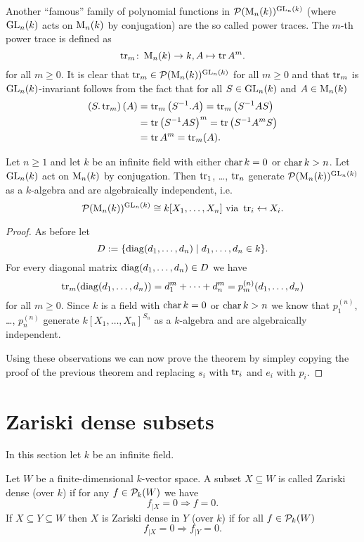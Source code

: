 Another ``famous'' family of polynomial functions in $\mathcal{P}(\operatorname{M}_n(k))^{\operatorname{GL}_n(k)}$ (where $\operatorname{GL}_n(k)$ acts on $\operatorname{M}_n(k)$ by conjugation) are the so called power traces. The $m$-th power trace is defined as
\[
 \operatorname{tr}_m \colon \operatorname{M}_n(k) \to k, A \mapsto \operatorname{tr} A^m.
\]
for all $m \geq 0$. It is clear that $\operatorname{tr}_m \in \mathcal{P}(\operatorname{M}_n(k))^{\operatorname{GL}_n(k)}$ for all $m \geq 0$ and that $\operatorname{tr}_m$ is $\operatorname{GL}_n(k)$-invariant follows from the fact that for all $S \in \operatorname{GL}_n(k)$ and $A \in \operatorname{M}_n(k)$
\begin{align*}
 \left(S.\operatorname{tr}_m\right)(A)
 &= \operatorname{tr}_m\left(S^{-1}.A\right)
 = \operatorname{tr}_m\left(S^{-1} A S\right) \\
 &= \operatorname{tr} \left(S^{-1} A S\right)^m
 = \operatorname{tr} \left(S^{-1} A^m S\right) \\
 &= \operatorname{tr} A^m
 = \operatorname{tr}_m(A).
\end{align*}


\begin{thrm}
 Let $n \geq 1$ and let $k$ be an infinite field with either $\operatorname{char} k = 0$ or $\operatorname{char} k > n$. Let $\operatorname{GL}_n(k)$ act on $\operatorname{M}_n(k)$ by conjugation. Then $\operatorname{tr}_1$, \dots, $\operatorname{tr}_n$ generate $\mathcal{P}(\operatorname{M}_n(k))^{\operatorname{GL}_n(k)}$ as a $k$-algebra and are algebraically independent, i.e.
 \[
  \mathcal{P}(\operatorname{M}_n(k))^{\operatorname{GL}_n(k)} \cong k[X_1, \dotsc, X_n] \text{ via } \operatorname{tr}_i \mapsfrom X_i.
 \]
\end{thrm}
\begin{proof}
 As before let 
 \[
  D := \{\operatorname{diag}(d_1, \dotsc, d_n) \mid d_1, \dotsc, d_n \in k\}.
 \]
 For every diagonal matrix $\operatorname{diag}(d_1, \dotsc, d_n) \in D$ we have
 \[
  \operatorname{tr}_m(\operatorname{diag}(d_1, \dotsc, d_n)) = d_1^m + \dotsb + d_n^m = p^{(n)}_m(d_1, \dotsc, d_n)
 \]
 for all $m \geq 0$. Since $k$ is a field with $\operatorname{char} k = 0$ or $\operatorname{char} k > n$ we know that $p^{(n)}_1$, \dots, $p^{(n)}_n$ generate $k[X_1, \dotsc, X_n]^{S_n}$ as a $k$-algebra and are algebraically independent.
 
 Using these observations we can now prove the theorem by simpley copying the proof of the previous theorem and replacing $s_i$ with $\operatorname{tr}_i$ and $e_i$ with $p_i$.
\end{proof}





\section{Zariski dense subsets}
In this section let $k$ be an infinite field.


\begin{defi}
 Let $W$ be a finite-dimensional $k$-vector space. A subset $X \subseteq W$ is called Zariski dense (over $k$) if for any $f \in \mathcal{P}_k(W)$ we have
 \[
  f_{|X} = 0 \Rightarrow f = 0.
 \]
 If $X \subseteq Y \subseteq W$ then $X$ is Zariski dense in $Y$ (over $k$) if for all $f \in \mathcal{P}_k(W)$
 \[
  f_{|X} = 0 \Rightarrow f_{|Y} = 0.
 \]
\end{defi}


